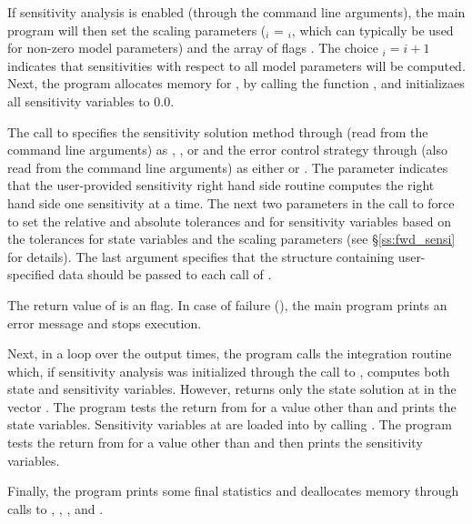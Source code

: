 If sensitivity analysis is enabled (through the command line arguments), 
the main program will then set the scaling parameters
 ($_i$ = $_i$, which can typically be used for 
non-zero model parameters) and the array of flags . The choice $_i=i+1$
indicates that sensitivities with respect to all model parameters will be computed.
Next, the program allocates memory for , by calling the {\nvector} function 
, and initializaes all sensitivity variables to $0.0$.

The call to  specifies the sensitivity solution method through 
 (read from the command line arguments) as , 
, or  and the error control strategy through 
(also read from the command line arguments) as either  or .
The  parameter indicates that the user-provided sensitivity right hand side
routine  computes the right hand side one sensitivity at a time. 
The next two  parameters in the call to 
force {\cvodes} to set the relative and absolute
tolerances  and  for sensitivity variables based on the tolerances for 
state variables and the scaling parameters  (see \S\ref{ss:fwd_sensi} for details).
The last argument specifies that the structure  containing user-specified data
should be passed to each call of .

The return value of  is an  flag. In case of failure
(), the main program prints an error message and stops execution.

Next, in a loop over the  output times, the program calls the integration
routine  which, if sensitivity analysis was initialized through the call
to , computes both state and sensitivity variables. However,
 returns only the state solution at  in the vector .
The program tests the return from  for a value other than  and
prints the state variables.
Sensitivity variables at  are loaded into  by calling .
The program tests the return from  for a value other than  
and then prints the sensitivity variables.

Finally, the program prints some final statistics and deallocates memory through calls
to , , , and .

